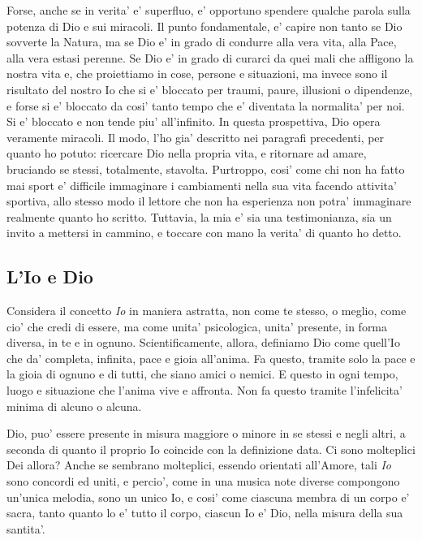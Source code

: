 Forse, anche se in verita' e' superfluo, e' opportuno spendere qualche parola sulla potenza di Dio e sui miracoli. Il punto fondamentale, e' capire non tanto se Dio sovverte la Natura, ma se Dio e' in grado di condurre alla vera vita, alla Pace, alla vera estasi perenne. Se Dio e' in grado di curarci da quei mali che affligono la nostra vita e, che proiettiamo in cose, persone e situazioni, ma invece sono il risultato del nostro Io che si e' bloccato per traumi, paure, illusioni o dipendenze, e forse si e' bloccato da cosi' tanto tempo che e' diventata la normalita' per noi. Si e' bloccato e non tende piu' all'infinito. In questa prospettiva, Dio opera veramente miracoli. Il modo, l'ho gia' descritto nei paragrafi precedenti, per quanto ho potuto: ricercare Dio nella propria vita, e ritornare ad amare, bruciando se stessi, totalmente, stavolta. Purtroppo, cosi' come chi non ha fatto mai sport e' difficile immaginare i cambiamenti nella sua vita facendo attivita' sportiva, allo stesso modo il lettore che non ha esperienza non potra' immaginare realmente quanto ho scritto. Tuttavia, la mia e' sia una testimonianza, sia un invito a mettersi in cammino, e toccare con mano la verita' di quanto ho detto.

\subsection{L'Io e Dio}

\label{DioScientificamentePoesia}
\label{DioScientificamentePsicologicamente}

Considera il concetto \emph{Io} in maniera astratta, non come te stesso, o meglio, come cio' che credi di essere, ma come unita' psicologica, unita' presente, in forma diversa, in te e in ognuno. Scientificamente, allora, definiamo Dio come quell'Io che da' completa, infinita, pace e gioia all'anima. Fa questo, tramite solo la pace e la gioia di ognuno e di tutti, che siano amici o nemici. E questo in ogni tempo, luogo e situazione che l'anima vive e affronta. Non fa questo tramite l'infelicita' minima di alcuno o alcuna. 

Dio, puo' essere presente in misura maggiore o minore in se stessi e negli altri, a seconda di quanto il proprio Io coincide con la definizione data. Ci sono molteplici Dei allora? Anche se sembrano molteplici, essendo orientati all'Amore, tali \emph{Io} sono concordi ed uniti, e percio', come in una musica note diverse compongono un'unica melodia, sono un unico Io, e cosi' come ciascuna membra di un corpo e' sacra, tanto quanto lo e' tutto il corpo, ciascun Io e' Dio, nella misura della sua santita'.

